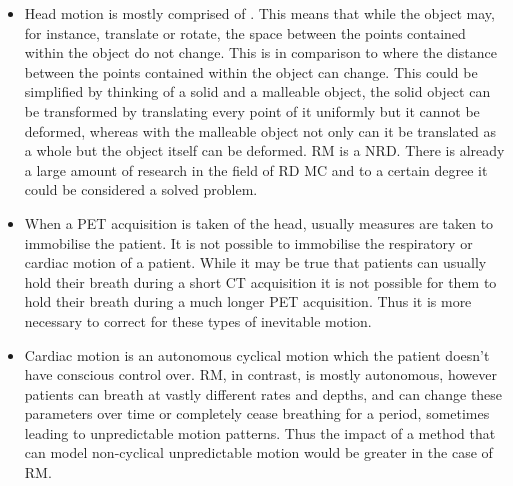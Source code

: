         \begin{itemize}
            \item Head motion is mostly comprised of . This means that while the object may, for instance, translate or rotate, the space between the points contained within the object do not change. This is in comparison to  where the distance between the points contained within the object can change. This could be simplified by thinking of a solid and a malleable object, the solid object can be transformed by translating every point of it uniformly but it cannot be deformed, whereas with the malleable object not only can it be translated as a whole but the object itself can be deformed. \gls{RM} is a \gls{NRD}. There is already a large amount of research in the field of \gls{RD} \gls{MC} and to a certain degree it could be considered a solved problem.
                
            \item When a \gls{PET} acquisition is taken of the head, usually measures are taken to immobilise the patient. It is not possible to immobilise the respiratory or cardiac motion of a patient. While it may be true that patients can usually hold their breath during a short \gls{CT} acquisition it is not possible for them to hold their breath during a much longer \gls{PET} acquisition. Thus it is more necessary to correct for these types of inevitable motion.
    
            \item Cardiac motion is an autonomous cyclical motion which the patient doesn't have conscious control over. \gls{RM}, in contrast, is mostly autonomous, however patients can breath at vastly different rates and depths, and can change these parameters over time or completely cease breathing for a period, sometimes leading to unpredictable motion patterns. %
            Thus the impact of a method that can model non-cyclical unpredictable motion would be greater in the case of \gls{RM}.
        \end{itemize}
    
